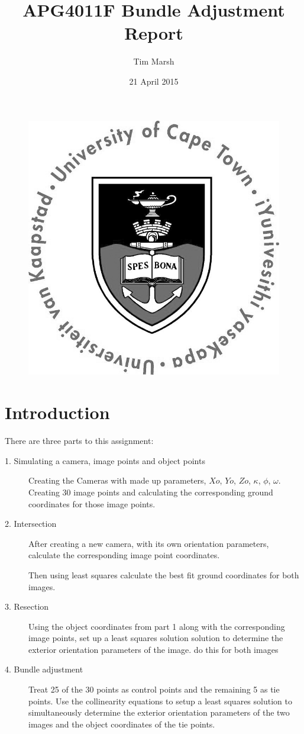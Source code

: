\documentclass[11pt,a4paper]{article}
\title{APG4011F Bundle Adjustment Report}
\date{21 April 2015}
\author{Tim Marsh}
\begin{document}
	
	\maketitle
	\begin{figure}[H]
		\centering
		\includegraphics[width=0.7\linewidth]{images/UCTcircular_logo1_CMYK}
		\label{fig:UCTcircular_logo1_CMYK}
	\end{figure}
	\newpage
	\tableofcontents
	\listoffigures
	\newpage
	
	
	\section{Introduction}
	
	There are three parts to this assignment:
	
	\begin{description}
			\item[1. Simulating a camera, image points and object points] Creating the Cameras with made up parameters, $Xo$, $Yo$, $Zo$, $\kappa$, $\phi$, $\omega$. Creating 30 image points and calculating the corresponding ground coordinates for those image points.
			
			\item[2. Intersection] After creating a new camera, with its own orientation parameters, calculate the corresponding image point coordinates.
			
			Then using least squares calculate the best fit ground coordinates for both images.
			
			\item[3. Resection] Using the object coordinates from part 1 along with the corresponding image points, set up a least squares solution solution to determine the exterior orientation parameters of the image. do this for both images
			
			\item[4. Bundle adjustment] Treat 25 of the 30 points as control points and the remaining 5 as tie points. Use the collinearity equations to setup a least squares solution to simultaneously determine the exterior orientation parameters of the two images and the object coordinates of the tie points.
			
	\end{description}
	
\end{document}
